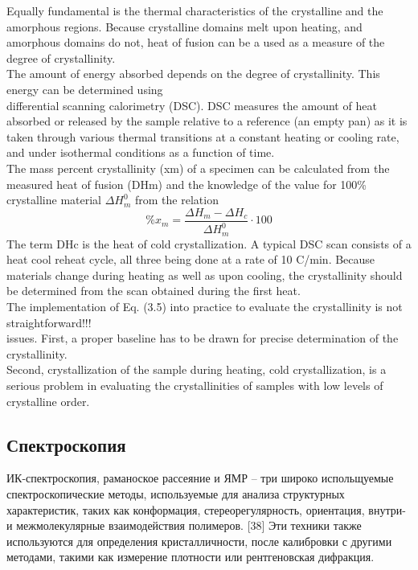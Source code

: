 Equally fundamental is the thermal characteristics of the crystalline and the amorphous
regions. Because crystalline domains melt upon heating, and amorphous domains do
not, heat of fusion can be a used as a measure of the degree of crystallinity. \\
The amount of energy absorbed
depends on the degree of crystallinity. This energy can be determined using\\
differential scanning calorimetry (DSC). DSC measures the amount of heat absorbed
or released by the sample relative to a reference (an empty pan) as it is taken through
various thermal transitions at a constant heating or cooling rate, and under
isothermal conditions as a function of time.\\
The mass percent crystallinity (xm) of a specimen can be calculated from the
measured heat of fusion (DHm) and the knowledge of the value for 100\% crystalline
material $\Delta H^0_m$
from the relation
\[
\%x_m = \frac{\Delta H_m - \Delta H_c }{\Delta H^0_m}\cdot100
\]
The term DHc is the heat of cold crystallization. A typical DSC scan consists of a heat cool reheat cycle, all three being done at a rate of 10 C/min. Because materials
change during heating as well as upon cooling, the crystallinity should be determined
from the scan obtained during the first heat.\\
The implementation of Eq. (3.5)
into practice to evaluate the crystallinity is not straightforward!!!\\
issues. First, a proper baseline has to be drawn for precise determination of the crystallinity. \\
Second, crystallization of the sample during heating, cold crystallization,
is a serious problem in evaluating the crystallinities of samples with low
levels of crystalline order.\\

\subsection{Спектроскопия}
ИК-спектроскопия, раманоское рассеяние и ЯМР -- три широко испольщуемые спектроскопические методы, используемые для анализа структурных характеристик, таких как конформация, стереорегулярность, ориентация, внутри- и межмолекулярные взаимодействия полимеров. [38] 
Эти техники также используются для определения кристалличности, после калибровки с другими методами, такими как измерение плотности или рентгеновская дифракция.



